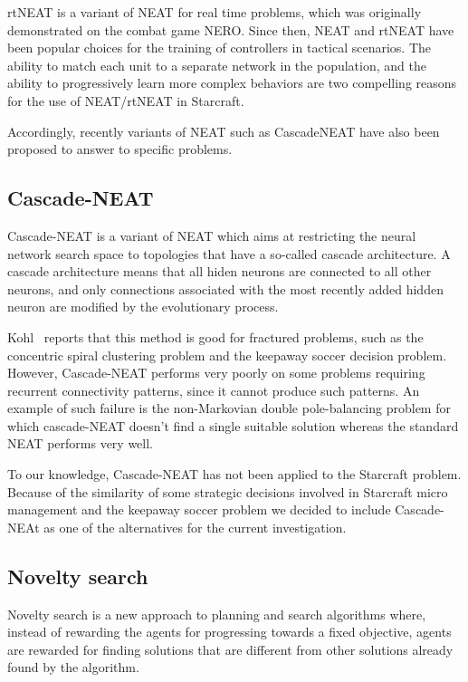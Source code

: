 rtNEAT is a variant of NEAT for real time problems, which was
originally demonstrated on the combat game NERO. Since then, NEAT and
rtNEAT have been popular choices for the training of controllers in
tactical scenarios. The ability to match each unit to a separate
network in the population, and the ability to progressively learn more
complex behaviors are two compelling reasons for the use of
NEAT/rtNEAT in Starcraft.

Accordingly, recently variants of NEAT such as CascadeNEAT have also
been proposed to answer to specific problems.

\subsection{Cascade-NEAT}\label{subsec:cascade-neat}

Cascade-NEAT is a variant of NEAT which aims at restricting the neural
network search space to topologies that have a so-called cascade
architecture. A cascade architecture means that all hiden neurons are
connected to all other neurons, and only connections associated with
the most recently added hidden neuron are modified by the evolutionary
process.

Kohl~\cite{Kohl09FracturedProblems, Kohl09StrategicDecisions} reports that this method is good for
fractured problems, such as the concentric spiral clustering problem
and the keepaway soccer decision problem. However, Cascade-NEAT
performs very poorly on some problems requiring recurrent connectivity
patterns, since it cannot produce such patterns. An example of such
failure is the non-Markovian double pole-balancing problem for which
cascade-NEAT doesn't find a single suitable solution whereas the
standard NEAT performs very well.

To our knowledge, Cascade-NEAT has not been applied to the Starcraft
problem. Because of the similarity of some strategic decisions
involved in Starcraft micro management and the keepaway soccer problem
we decided to include Cascade-NEAt as one of the alternatives for the
current investigation.

\subsection{Novelty search}\label{subsec:novelty-search}

Novelty search is a new approach to planning and search algorithms
where, instead of rewarding the agents for progressing towards a fixed
objective, agents are rewarded for finding solutions that are different
from other solutions already found by the algorithm.

